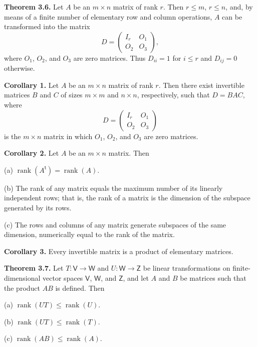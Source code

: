 \documentclass{article}
\newcommand{\0}{\mathit{0}}
\begin{document}
\medskip

\textbf{Theorem 3.6.} Let $A$ be an $m \times n$ matrix of rank $r$. Then $r \leq m$, $r \leq n$,
and, by means of a finite number of elementary row and column operations,
$A$ can be transformed into the matrix
\[
    D =
    \begin{pmatrix}
        I_r & O_1 \\
        O_2 & O_3
    \end{pmatrix},
\]
where $O_1$, $O_2$, and $O_3$ are zero matrices. Thus $D_{ii} = 1$ for $i \leq r$ and
$D_{ij} = 0$ otherwise.

\medskip

\textbf{Corollary 1.} Let $A$ be an $m \times n$ matrix of rank $r$. Then there exist
invertible matrices $B$ and $C$ of sizes $m \times m$ and $n \times n$, respectively, such that
$D = BAC$,
where
\[
    D =
    \begin{pmatrix}
        I_r & O_1 \\
        O_2 & O_3
    \end{pmatrix}
\]
is the $m \times n$ matrix in which $O_1$, $O_2$, and $O_3$ are zero matrices.

\medskip

\textbf{Corollary 2.} Let $A$ be an $m \times n$ matrix. Then

(a) $\operatorname{rank}(A^{\mathsf{t}}) = \operatorname{rank}(A)$.

(b) The rank of any matrix equals the maximum number of its linearly independent rows; that is, the rank of a matrix is the dimension of the subspace generated by its rows.

(c) The rows and columns of any matrix generate subspaces of the same dimension, numerically equal to the rank of the matrix.

\medskip

\textbf{Corollary 3.} Every invertible matrix is a product of elementary matrices.

\medskip

\textbf{Theorem 3.7.} Let $T: \mathsf{V} \to \mathsf{W}$ and $U: \mathsf{W} \to \mathsf{Z}$ be linear transformations
on finite-dimensional vector spaces $\mathsf{V}$, $\mathsf{W}$, and $\mathsf{Z}$, and let $A$ and $B$ be matrices
such that the product $AB$ is defined. Then

(a) $\operatorname{rank}(UT) \leq \operatorname{rank}(U)$.

(b) $\operatorname{rank}(UT) \leq \operatorname{rank}(T)$.

(c) $\operatorname{rank}(AB) \leq \operatorname{rank}(A)$.
\end{document}
